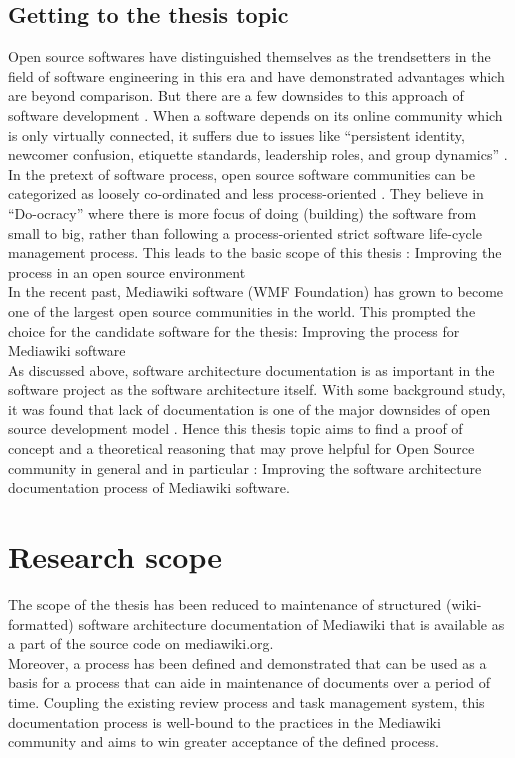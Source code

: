 {\subsection{Getting to the thesis topic}
\indent Open source softwares have distinguished themselves as the trendsetters in the field of software engineering in this era and have demonstrated advantages which are beyond comparison. But there are a few downsides to this approach of software development \cite{Scacchi2007}. When a software depends on its online community which is only virtually connected, it suffers due to issues like  \enquote{persistent identity, newcomer confusion, etiquette standards, leadership roles, and group dynamics} \cite{Kim:2000:CBW:518514}. In the pretext of software process, open source software communities can be categorized as loosely co-ordinated and less process-oriented \cite{Zhao2003}. They believe in \enquote{Do-ocracy} where there is more focus of doing (building) the software from small to big, rather than following a process-oriented strict software life-cycle management process. This leads to the basic scope of this thesis : Improving the process in an open source environment
\\\indent In the recent past, Mediawiki software (WMF Foundation) has grown to become one of the largest open source communities in the world. This prompted the choice for the candidate software for the thesis: Improving the process for Mediawiki software
\\\indent As discussed above, software architecture documentation is as important in the software project as the software architecture itself. With some background study, it was found that lack of documentation is one of the major downsides of open source development model \cite{6923128} \cite{Zhao2003}. Hence this thesis topic aims to find a proof of concept  and a theoretical reasoning that may prove helpful for Open Source community in general and in particular : Improving the software architecture documentation process of Mediawiki software.

\section{Research scope}\label{sec:scope}
The scope of the thesis has been reduced to maintenance of structured (wiki-formatted) software architecture documentation of Mediawiki that is available as a part of the source code on mediawiki.org.
\\\indent Moreover, a process has been defined and demonstrated that can be used as a basis for a process that can aide in maintenance of documents over a period of time. Coupling the existing review process and task management system, this documentation process is well-bound to the practices in the Mediawiki community and aims to win greater acceptance of the defined process. \cite{6923128}

}
